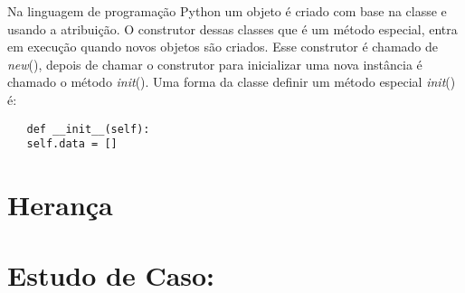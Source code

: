 	 Na linguagem de programação Python um objeto é criado com base na classe e usando a atribuição. O construtor dessas classes que é um método especial, entra em execução quando novos objetos são criados. Esse construtor é chamado de \textunderscore\textunderscore \textit{new}\textunderscore\textunderscore(), depois de chamar o construtor para inicializar uma nova instância é chamado o método \textunderscore\textunderscore \textit{init}\textunderscore\textunderscore(). Uma forma da classe definir um método especial \textunderscore\textunderscore \textit{init}\textunderscore\textunderscore() é:
	 \begin{lstlisting}
   def __init__(self):
   self.data = []
	 \end{lstlisting}
	 
	
    \section{Herança}
	

    \section{Estudo de Caso: }
